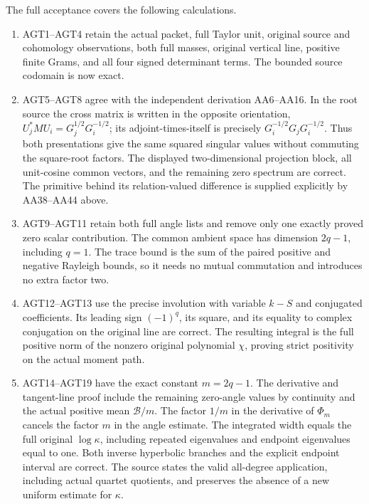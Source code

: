The full acceptance covers the following calculations.

\begin{enumerate}
\def\labelenumi{\arabic{enumi}.}
\tightlist
\item
  AGT1--AGT4 retain the actual packet, full Taylor unit, original source and cohomology observations, both full masses, original vertical line, positive finite Grams, and all four signed determinant terms. The bounded source codomain is now exact.
\item
  AGT5--AGT8 agree with the independent derivation AA6--AA16. In the root source the cross matrix is written in the opposite orientation, \(U_j^*MU_i=G_j^{1/2}G_i^{-1/2}\); its adjoint-times-itself is precisely \(G_i^{-1/2}G_jG_i^{-1/2}\). Thus both presentations give the same squared singular values without commuting the square-root factors. The displayed two-dimensional projection block, all unit-cosine common vectors, and the remaining zero spectrum are correct. The primitive behind its relation-valued difference is supplied explicitly by AA38--AA44 above.
\item
  AGT9--AGT11 retain both full angle lists and remove only one exactly proved zero scalar contribution. The common ambient space has dimension \(2q-1\), including \(q=1\). The trace bound is the sum of the paired positive and negative Rayleigh bounds, so it needs no mutual commutation and introduces no extra factor two.
\item
  AGT12--AGT13 use the precise involution with variable \(k-S\) and conjugated coefficients. Its leading sign \((-1)^q\), its square, and its equality to complex conjugation on the original line are correct. The resulting integral is the full positive norm of the nonzero original polynomial \(\chi\), proving strict positivity on the actual moment path.
\item
  AGT14--AGT19 have the exact constant \(m=2q-1\). The derivative and tangent-line proof include the remaining zero-angle values by continuity and the actual positive mean \(\mathcal B/m\). The factor \(1/m\) in the derivative of \(\Phi_m\) cancels the factor \(m\) in the angle estimate. The integrated width equals the full original \(\log\kappa\), including repeated eigenvalues and endpoint eigenvalues equal to one. Both inverse hyperbolic branches and the explicit endpoint interval are correct. The source states the valid all-degree application, including actual quartet quotients, and preserves the absence of a new uniform estimate for \(\kappa\).
\end{enumerate}

